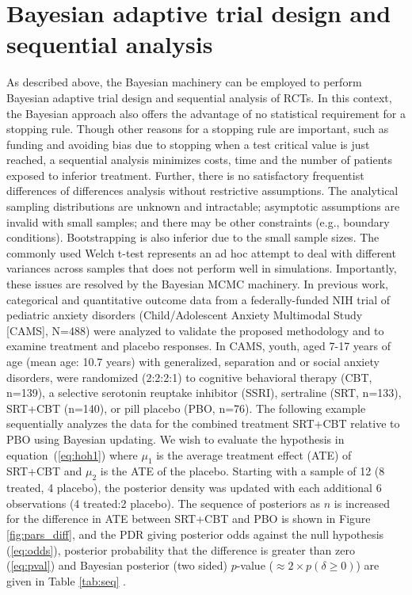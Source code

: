 \documentclass{juliacon}
\begin{document}
\section{Bayesian adaptive trial design and sequential analysis}
As described above, the Bayesian machinery can be employed to perform Bayesian adaptive trial design and sequential analysis of RCTs. In this context, the Bayesian approach also offers the advantage of no statistical requirement for a stopping rule. Though other reasons for a stopping rule are important, such as funding and avoiding bias due to stopping when a test critical value is just reached, a sequential analysis minimizes costs, time and the number of patients exposed to inferior treatment. Further, there is no satisfactory frequentist differences of differences analysis without restrictive assumptions. The analytical sampling distributions are unknown and intractable; asymptotic assumptions are invalid with small samples; and there may be other constraints (e.g., boundary conditions). Bootstrapping is also inferior due to the small sample sizes. The commonly used Welch t-test represents an ad hoc attempt to deal with different variances across samples that does not perform well in simulations.\cite{Mills2019}  Importantly, these issues are resolved by the Bayesian MCMC machinery.
\vskip 6pt
In previous work,\cite{Strawn2018,Mills2019} categorical and quantitative outcome data from a federally-funded NIH trial of pediatric anxiety disorders (Child/Adolescent Anxiety Multimodal Study [CAMS], N=488) were analyzed to validate the proposed methodology and to examine treatment and placebo responses. In CAMS, youth, aged 7-17 years of age (mean age: 10.7 years) with generalized, separation and or social anxiety disorders, were randomized (2:2:2:1) to cognitive behavioral therapy (CBT, n=139), a selective serotonin reuptake inhibitor (SSRI), sertraline (SRT, n=133), SRT+CBT (n=140), or pill placebo (PBO, n=76).
\vskip 6pt
The following example sequentially analyzes the data for the combined treatment SRT+CBT relative to PBO using Bayesian updating.  We wish to evaluate the hypothesis in equation~(\ref{eq:hoh1}) where $\mu_1$ is the average treatment effect (ATE) of SRT+CBT and $\mu_2$ is the ATE of the placebo. Starting with a sample of 12 (8 treated, 4 placebo), the posterior density was updated with each additional 6 observations (4 treated:2 placebo).  The sequence of posteriors as $n$ is increased for the difference in ATE between SRT+CBT and PBO is shown in Figure \ref{fig:pars_diff}, and the PDR giving posterior odds against the null hypothesis (\ref{eq:odds}), posterior probability that the difference is greater than zero (\ref{eq:pval}) and Bayesian  posterior (two sided) $p$-value ($\approx 2\times p(\delta \ge 0)$) are given in Table \ref{tab:seq} .
\end{document}
